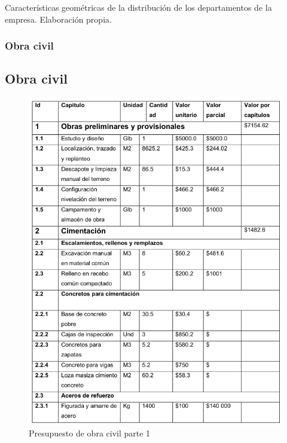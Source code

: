 Características geométricas de la distribución de los departamentos de
la empresa. Elaboración propia.







\subsubsection{Obra civil}




\subsection{Obra civil}

\begin{figure}[H]
    \centering	
    \includegraphics[width=1.0\textwidth]{chapters/ELC1.png} 
    \caption{Presupuesto de obra civil parte 1}
\label{fig:croquis190125}
\end{figure}


